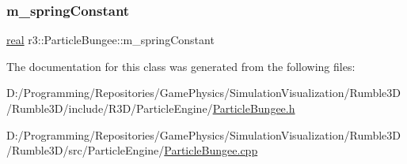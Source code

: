 \subsubsection{\texorpdfstring{m\+\_\+spring\+Constant}{m\_springConstant}}
{\footnotesize\ttfamily \mbox{\hyperlink{namespacer3_ab2016b3e3f743fb735afce242f0dc1eb}{real}} r3\+::\+Particle\+Bungee\+::m\+\_\+spring\+Constant\hspace{0.3cm}{\ttfamily [protected]}}



The documentation for this class was generated from the following files\+:\begin{DoxyCompactItemize}
\item 
D\+:/\+Programming/\+Repositories/\+Game\+Physics/\+Simulation\+Visualization/\+Rumble3\+D/\+Rumble3\+D/include/\+R3\+D/\+Particle\+Engine/\mbox{\hyperlink{_particle_bungee_8h}{Particle\+Bungee.\+h}}\item 
D\+:/\+Programming/\+Repositories/\+Game\+Physics/\+Simulation\+Visualization/\+Rumble3\+D/\+Rumble3\+D/src/\+Particle\+Engine/\mbox{\hyperlink{_particle_bungee_8cpp}{Particle\+Bungee.\+cpp}}\end{DoxyCompactItemize}
